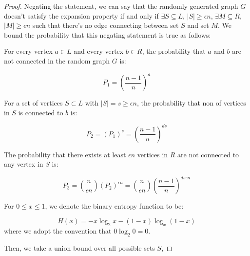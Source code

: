 \begin{proof}

Negating the statement, we can say that the randomly generated graph $G$ doesn't satisfy the expansion property if and only if $\exists S \subseteq L$, $|S| \ge \epsilon n$, $\exists M \subseteq R$, $|M| \ge  \epsilon n$ such that there's no edge connecting between set $S$ and set $M$. We bound the probability that this negating statement is true as follows:

For every vertex $a \in L$ and every vertex $b \in R$, the probability that $a$ and $b$ are not connected in the random graph $G$ is:

$$P_1 = (\frac{n-1}{n})^{d}$$

For a set of vertices $S \subset L$ with $|S| = s \ge \epsilon n$, the probability that non of vertices in $S$ is connected to $b$ is:

$$P_2 = (P_1)^s = (\frac{n-1}{n})^{d s}$$

The probability that there exists at least $\epsilon n$ vertices in $R$ are not connected to any vertex in $S$ is:

$$P_3 = \binom{n}{\epsilon n} (P_2)^{\epsilon n} = \binom{n}{\epsilon n} (\frac{n-1}{n})^{d s \epsilon n}$$

For $0 \le x \le 1$, we denote the binary entropy function to be:

$$H(x) = -x\log_2 x - (1-x)\log_x (1-x)$$ 
where we adopt the convention that $0 \log_2 0 = 0$.

Then, we take a union bound over all possible sets $S$, 


\end{proof}
